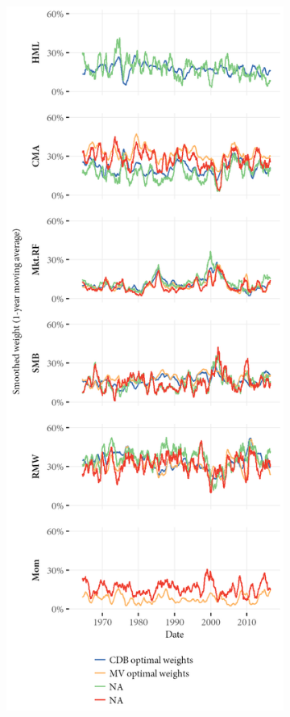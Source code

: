 \begin{figure}[!ht]
  \centering
  \footnotesize
  \renewcommand{\arraystretch}{1.2}
  \caption{Mean-variance and CDB optimal weights}

  \begin{subfigure}{0.45\textwidth}
    \includegraphics[width=\textwidth]{graphics/weights/compare_Weights_CDB_MV_5F.png}

\end{subfigure}
\end{figure}
